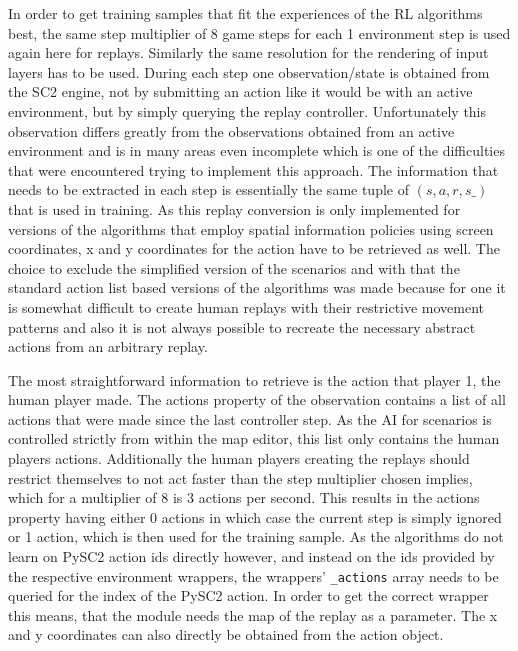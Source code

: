 In order to get training samples that fit the experiences of the RL algorithms best, the same step multiplier of 8 game steps for each 1 environment step is used again here for replays. Similarly the same resolution for the rendering of input layers has to be used. During each step one observation/state is obtained from the SC2 engine, not by submitting an action like it would be with an active environment, but by simply querying the replay controller. Unfortunately this observation differs greatly from the observations obtained from an active environment and is in many areas even incomplete which is one of the difficulties that were encountered trying to implement this approach. The information that needs to be extracted in each step is essentially the same tuple of 
$(s, a, r, s\_)$
that is used in training. As this replay conversion is only implemented for versions of the algorithms that employ spatial information policies using screen coordinates, x and y coordinates for the action have to be retrieved as well. The choice to exclude the simplified version of the scenarios and with that the standard action list based versions of the algorithms was made because for one it is somewhat difficult to create human replays with their restrictive movement patterns and also it is not always possible to recreate the necessary abstract actions from an arbitrary replay.

The most straightforward information to retrieve is the action that player 1, the human player made. The actions property of the observation contains a list of all actions that were made since the last controller step. As the AI for scenarios is controlled strictly from within the map editor, this list only contains the human players actions. Additionally the human players creating the replays should restrict themselves to not act faster than the step multiplier chosen implies, which for a multiplier of 8 is 3 actions per second. This results in the actions property having either 0 actions in which case the current step is simply ignored or 1 action, which is then used for the training sample. As the algorithms do not learn on PySC2 action ids directly however, and instead on the ids provided by the respective environment wrappers, the wrappers' \lstinline{_actions} array needs to be queried for the index of the PySC2 action. In order to get the correct wrapper this means, that the module needs the map of the replay as a parameter. The x and y coordinates can also directly be obtained from the action object.

